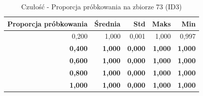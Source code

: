 \begin{table}[htbp]
\centering
\small
\setlength{\tabcolsep}{6pt}
\renewcommand{\arraystretch}{1.2}
\caption{Czułość - Proporcja próbkowania na zbiorze 73 (ID3)}
\label{tab:ID3_sample_ratio_73_recall}
\begin{tabular}{r|r|r|r|r}
\toprule
Proporcja próbkowania & Średnia & Std & Maks & Min \\
\hline
0,200 & 1,000 & 0,001 & 1,000 & 0,997 \\
\textbf{0,400} & \textbf{1,000} & \textbf{0,000} & \textbf{1,000} & \textbf{1,000} \\
\textbf{0,600} & \textbf{1,000} & \textbf{0,000} & \textbf{1,000} & \textbf{1,000} \\
\textbf{0,800} & \textbf{1,000} & \textbf{0,000} & \textbf{1,000} & \textbf{1,000} \\
\textbf{1,000} & \textbf{1,000} & \textbf{0,000} & \textbf{1,000} & \textbf{1,000} \\
\bottomrule
\end{tabular}
\end{table}
